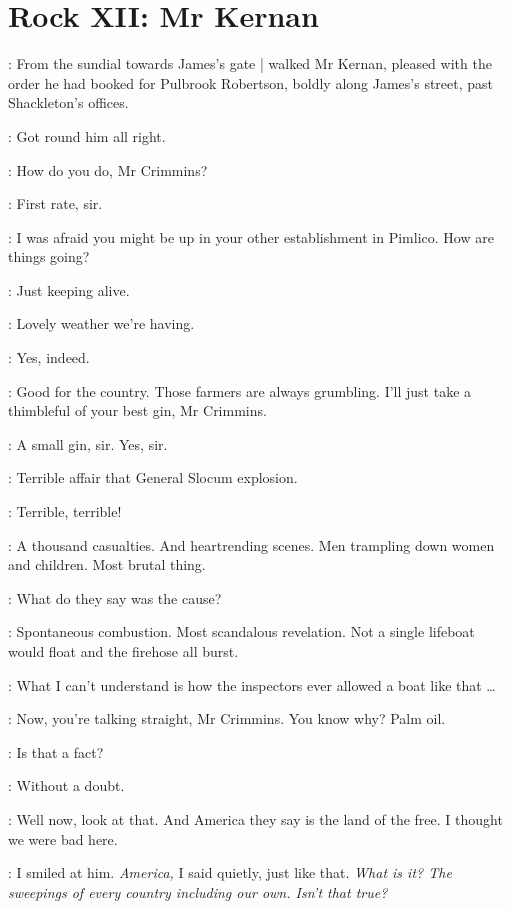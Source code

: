 \section*{Rock XII: Mr Kernan}


:
From the sundial
towards James's gate |
walked Mr Kernan,
pleased with the order he had booked for Pulbrook Robertson,
boldly along James's street,
past Shackleton's offices.

:
Got round him all right.

:
How do you do, Mr Crimmins?

\crimmins:
First rate, sir.

:
I was afraid you might be up in your other establishment in Pimlico.
How are things going?

\crimmins:
Just keeping alive.

:
Lovely weather we're having.

\crimmins:
Yes, indeed.

:
Good for the country.
Those farmers are always grumbling.
I'll just take a thimbleful of your best gin, Mr Crimmins.

\crimmins:
A small gin, sir.
Yes, sir.

:
Terrible affair that General Slocum explosion.

\crimmins:
Terrible, terrible!

:
A thousand casualties.
And heartrending scenes.
Men trampling down women and children.
Most brutal thing.

\crimmins:
What do they say was the cause?

:
Spontaneous combustion.
Most scandalous revelation.
Not a single lifeboat would float and the firehose all burst.

\crimmins:
What I can't understand
is how the inspectors ever allowed a boat like that \ldots

:
Now, you're talking straight, Mr Crimmins.
You know why?
Palm oil.

\crimmins:
Is that a fact?

:
Without a doubt.

\crimmins:
Well now, look at that.
And America they say is the land of the free.
I thought we were bad here.

:
I smiled at him.
\emph{America,}
I said quietly,
just like that.
\emph{What is it?
The sweepings of every country including our own.
Isn't that true?}


